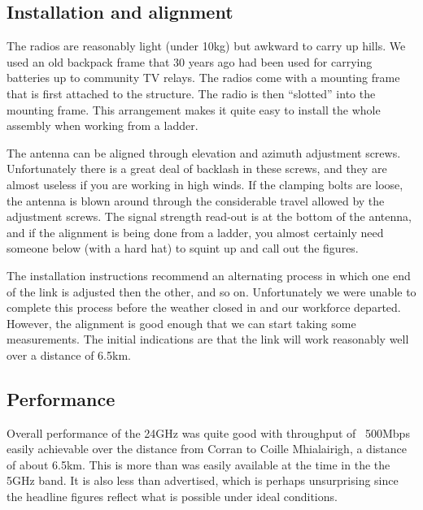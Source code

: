 \documentclass{amsart}
\begin{document}
\subsection{Installation and alignment}
\label{january-2014.-installation-and-alignment}

The radios are reasonably light (under 10kg) but awkward to carry up
hills. We used an old backpack frame that 30 years ago had been used
for carrying batteries up to community TV relays. The radios come with
a mounting frame that is first attached to the structure. The radio is
then ``slotted'' into the mounting frame. This arrangement makes it
quite easy to install the whole assembly when working from a ladder.

The antenna can be aligned through elevation and azimuth
adjustment screws. Unfortunately there is a great deal of backlash in
these screws, and they are almost useless if you are working in high
winds. If the clamping bolts are loose, the antenna is blown around
through the considerable travel allowed by the adjustment screws. The
signal strength read-out is at the bottom of the antenna, and if
the alignment is being done from a ladder, you almost certainly
need someone below (with a hard hat) to squint up and call out
the figures.

The installation instructions recommend an alternating process in which
one end of the link is adjusted then the other, and so
on. Unfortunately we were unable to complete this process before
the weather closed in and our workforce departed. However, the
alignment is good enough that we can start taking some measurements.
The initial indications are that the link will work reasonably well
over a distance of 6.5km.

\subsection{Performance}
\label{performance}

Overall performance of the 24GHz was quite good with throughput of
~500Mbps easily achievable over the distance from Corran to Coille
Mhialairigh, a distance of about 6.5km. This is more than was easily
available at the time in the the 5GHz band. It is also less than
advertised, which is perhaps unsurprising since the headline figures
reflect what is possible under ideal conditions.
\end{document}
